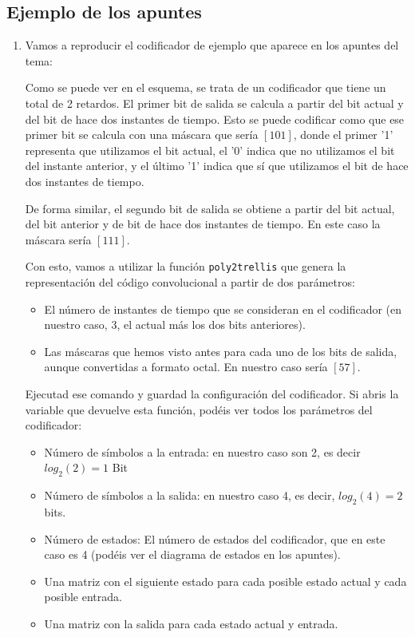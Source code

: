 \documentclass[es,practica]{uah}
\begin{document}
\subsection{Ejemplo de los apuntes}
	\begin{enumerate}
	
		\item Vamos a reproducir el codificador de ejemplo que aparece en los apuntes del tema:

		Como se puede ver en el esquema, se trata de un codificador que tiene un total de 2 retardos. El primer bit de salida se calcula a partir del bit actual y del bit de hace dos instantes de tiempo. Esto se puede codificar como que ese primer bit se calcula con una máscara que sería $[1 0 1]$, donde el primer '1' representa que utilizamos el bit actual, el '0' indica que no utilizamos el bit del instante anterior, y el último '1' indica que sí que utilizamos el bit de hace dos instantes de tiempo. 

		De forma similar, el segundo bit de salida se obtiene a partir del bit actual, del bit anterior y de bit de hace dos instantes de tiempo. En este caso la máscara sería $[1 1 1]$. 

		Con esto, vamos a utilizar la función \texttt{poly2trellis} que genera la representación del código convolucional a partir de dos parámetros:

		\begin{itemize}
				\item El número de instantes de tiempo que se consideran en el codificador (en nuestro caso, 3, el actual más los dos bits anteriores).
				\item Las máscaras que hemos visto antes para cada uno de los bits de salida, aunque convertidas a formato octal. En nuestro caso sería $[5 7]$.
		\end{itemize}

		Ejecutad ese comando y guardad la configuración del codificador. Si abris la variable que devuelve esta función, podéis ver todos los parámetros del codificador: 
		\begin{itemize}
			\item Número de símbolos a la entrada: en nuestro caso son 2, es decir $log_2(2) = 1$ Bit
			\item Número de símbolos a la salida: en nuestro caso 4, es decir, $log_2(4) = 2$ bits. 
			\item Número de estados: El número de estados del codificador, que en este caso es 4 (podéis ver el diagrama de estados en los apuntes).
			\item Una matriz con el siguiente estado para cada posible estado actual y cada posible entrada.
			\item Una matriz con la salida para cada estado actual y entrada. 
		\end{itemize}
		

\end{enumerate}
\end{document}
